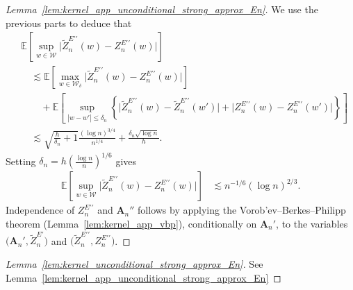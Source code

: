 \documentclass[11pt,lof]{puthesis}
\newcommand{\E}{\ensuremath{\mathbb{E}}}
\newcommand{\bA}{\ensuremath{\mathbf{A}}}
\newcommand{\cW}{\ensuremath{\mathcal{W}}}
\newcommand{\dprime}{\ensuremath{\prime\prime}}
\theoremstyle{break}
\theoremstyle{proof}
\newtheorem{proof}{Proof}
\begin{document}
\begin{proof}[Lemma~\ref{lem:kernel_app_unconditional_strong_approx_En}]
  We use the previous parts to deduce that
  \begin{align*}
    &\E\left[
      \sup_{w \in \cW}
      \big|\tilde Z_n^{E\dprime}(w) - Z_n^{E\dprime}(w)\big|
    \right] \\
    &\quad\lesssim
    \E\left[
      \max_{w \in \cW_\delta}
      \big|\tilde Z_n^{E\dprime}(w) - Z_n^{E\dprime}(w)\big|
    \right] \\
    &\qquad+
    \E\left[
      \sup_{|w-w'| \leq \delta_n}
      \left\{
        \big|\tilde Z_n^{E\dprime}(w) - \tilde Z_n^{E\dprime}(w')\big|
        + \big|Z_n^{E\dprime}(w) - Z_n^{E\dprime}(w')\big|
      \right\}
    \right] \\
    &\quad\lesssim
    \sqrt{\frac{h}{\delta_n} + 1}
    \frac{(\log n)^{3/4}}{n^{1/4}}
    + \frac{\delta_n \sqrt{\log n}}{h}.
  \end{align*}
  Setting
  $\delta_n = h \left( \frac{\log n}{n} \right)^{1/6}$
  gives
  \begin{align*}
    \E\left[
      \sup_{w \in \cW}
      \big|\tilde Z_n^{E\dprime}(w) - Z_n^{E\dprime}(w)\big|
    \right]
    &\lesssim
    n^{-1/6} (\log n)^{2/3}.
  \end{align*}
  Independence of $Z_n^{E\dprime}$ and $\bA_n''$
  follows by applying the
  Vorob'ev--Berkes--Philipp theorem (Lemma~\ref{lem:kernel_app_vbp}),
  conditionally on $\bA_n'$, to the variables
  $\big(\bA_n', \tilde Z_n^{E\prime}\big)$ and
  $\big(\tilde Z_n^{E\dprime}, Z_n^{E\dprime}\big)$.
\end{proof}

\begin{proof}[Lemma~\ref{lem:kernel_unconditional_strong_approx_En}]
  See Lemma~\ref{lem:kernel_app_unconditional_strong_approx_En}
\end{proof}
\end{document}
